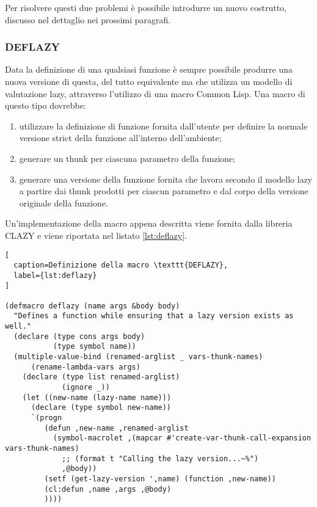 Per risolvere questi due problemi è possibile introdurre un nuovo costrutto,
discusso nel dettaglio nei prossimi paragrafi.

\subsubsection{DEFLAZY}

Data la definizione di una qualsiasi funzione è sempre possibile produrre una
nuova versione di questa, del tutto equivalente ma che utilizza un modello di
valutazione lazy, attraverso l’utilizzo di una macro Common Lisp. Una macro di
questo tipo dovrebbe:

\begin{enumerate}

\item utilizzare la definizione di funzione fornita dall'utente per definire la
normale versione strict della funzione all'interno dell'ambiente;

\item generare un thunk per ciascuna parametro della funzione;

\item generare una versione della funzione fornita che lavora secondo il modello
lazy a partire dai thunk prodotti per ciascun parametro e dal corpo della
versione originale della funzione.

\end{enumerate}

Un'implementazione della macro appena descritta viene fornita dalla libreria
CLAZY \cite{DBLP:journals/corr/Antoniotti14} e viene riportata nel listato
\ref{lst:deflazy}.

\begin{lstlisting}[
  caption=Definizione della macro \texttt{DEFLAZY},
  label={lst:deflazy}
]

(defmacro deflazy (name args &body body)
  "Defines a function while ensuring that a lazy version exists as well."
  (declare (type cons args body)
           (type symbol name))
  (multiple-value-bind (renamed-arglist _ vars-thunk-names)
      (rename-lambda-vars args)
    (declare (type list renamed-arglist)
             (ignore _))
    (let ((new-name (lazy-name name)))
      (declare (type symbol new-name))
      `(progn
         (defun ,new-name ,renamed-arglist
           (symbol-macrolet ,(mapcar #'create-var-thunk-call-expansion vars-thunk-names)
             ;; (format t "Calling the lazy version...~%")
             ,@body))
         (setf (get-lazy-version ',name) (function ,new-name))
         (cl:defun ,name ,args ,@body)
         ))))

\end{lstlisting}

